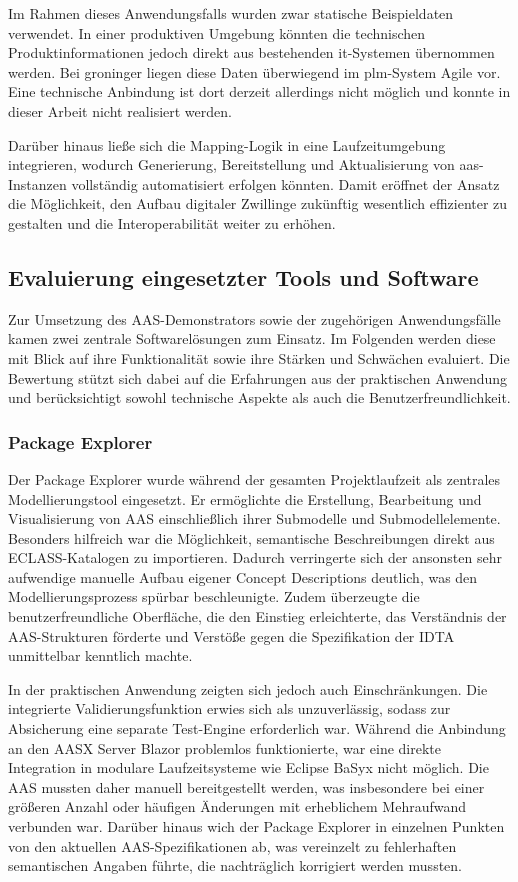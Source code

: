 Im Rahmen dieses Anwendungsfalls wurden zwar statische Beispieldaten verwendet. 
In einer produktiven Umgebung könnten die technischen Produktinformationen jedoch direkt aus bestehenden \acs{it}-Systemen übernommen werden. 
Bei groninger liegen diese Daten überwiegend im \acs{plm}-System Agile vor. 
Eine technische Anbindung ist dort derzeit allerdings nicht möglich und konnte in dieser Arbeit nicht realisiert werden.

Darüber hinaus ließe sich die Mapping-Logik in eine Laufzeitumgebung integrieren, wodurch Generierung, Bereitstellung und Aktualisierung von \acs{aas}-Instanzen vollständig automatisiert erfolgen könnten. 
Damit eröffnet der Ansatz die Möglichkeit, den Aufbau digitaler Zwillinge zukünftig wesentlich effizienter zu gestalten und die Interoperabilität weiter zu erhöhen.

\newpage
\subsection{Evaluierung eingesetzter Tools und Software}
\label{subsec:EvaluierungTools}
Zur Umsetzung des AAS-Demonstrators sowie der zugehörigen Anwendungsfälle kamen zwei zentrale Softwarelösungen zum Einsatz.
Im Folgenden werden diese mit Blick auf ihre Funktionalität sowie ihre Stärken und Schwächen evaluiert.
Die Bewertung stützt sich dabei auf die Erfahrungen aus der praktischen Anwendung und berücksichtigt sowohl technische Aspekte als auch die Benutzerfreundlichkeit.

\subsubsection{Package Explorer}

Der Package Explorer wurde während der gesamten Projektlaufzeit als zentrales Modellierungstool eingesetzt.
Er ermöglichte die Erstellung, Bearbeitung und Visualisierung von AAS einschließlich ihrer Submodelle und Submodellelemente.
Besonders hilfreich war die Möglichkeit, semantische Beschreibungen direkt aus ECLASS-Katalogen zu importieren.
Dadurch verringerte sich der ansonsten sehr aufwendige manuelle Aufbau eigener Concept Descriptions deutlich, was den Modellierungsprozess spürbar beschleunigte.
Zudem überzeugte die benutzerfreundliche Oberfläche, die den Einstieg erleichterte, das Verständnis der AAS-Strukturen förderte und Verstöße gegen die Spezifikation der IDTA unmittelbar kenntlich machte.

In der praktischen Anwendung zeigten sich jedoch auch Einschränkungen.
Die integrierte Validierungsfunktion erwies sich als unzuverlässig, sodass zur Absicherung eine separate Test-Engine erforderlich war.
Während die Anbindung an den AASX Server Blazor problemlos funktionierte, war eine direkte Integration in modulare Laufzeitsysteme wie Eclipse BaSyx nicht möglich.
Die AAS mussten daher manuell bereitgestellt werden, was insbesondere bei einer größeren Anzahl oder häufigen Änderungen mit erheblichem Mehraufwand verbunden war.
Darüber hinaus wich der Package Explorer in einzelnen Punkten von den aktuellen AAS-Spezifikationen ab, was vereinzelt zu fehlerhaften semantischen Angaben führte, die nachträglich korrigiert werden mussten.

